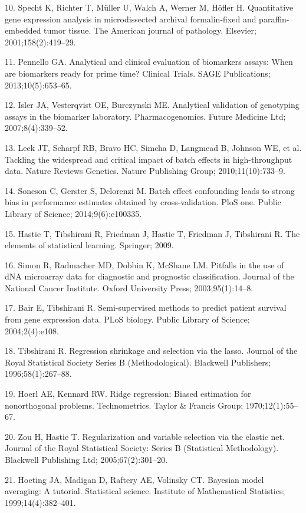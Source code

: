 \documentclass[11pt]{article}
\begin{document}
10. Specht K, Richter T, M{ü}ller U, Walch A, Werner M, H{ö}fler H.
Quantitative gene expression analysis in microdissected archival
formalin-fixed and paraffin-embedded tumor tissue. The American journal
of pathology. Elsevier; 2001;158(2):419--29.

11. Pennello GA. Analytical and clinical evaluation of biomarkers
assays: When are biomarkers ready for prime time? Clinical Trials. SAGE
Publications; 2013;10(5):653--65.

12. Isler JA, Vesterqvist OE, Burczynski ME. Analytical validation of
genotyping assays in the biomarker laboratory. Pharmacogenomics. Future
Medicine Ltd; 2007;8(4):339--52.

13. Leek JT, Scharpf RB, Bravo HC, Simcha D, Langmead B, Johnson WE, et
al. Tackling the widespread and critical impact of batch effects in
high-throughput data. Nature Reviews Genetics. Nature Publishing Group;
2010;11(10):733--9.

14. Soneson C, Gerster S, Delorenzi M. Batch effect confounding leads to
strong bias in performance estimates obtained by cross-validation. PloS
one. Public Library of Science; 2014;9(6):e100335.

15. Hastie T, Tibshirani R, Friedman J, Hastie T, Friedman J, Tibshirani
R. The elements of statistical learning. Springer; 2009.

16. Simon R, Radmacher MD, Dobbin K, McShane LM. Pitfalls in the use of
dNA microarray data for diagnostic and prognostic classification.
Journal of the National Cancer Institute. Oxford University Press;
2003;95(1):14--8.

17. Bair E, Tibshirani R. Semi-supervised methods to predict patient
survival from gene expression data. PLoS biology. Public Library of
Science; 2004;2(4):e108.

18. Tibshirani R. Regression shrinkage and selection via the lasso.
Journal of the Royal Statistical Society Series B (Methodological).
Blackwell Publishers; 1996;58(1):267--88.

19. Hoerl AE, Kennard RW. Ridge regression: Biased estimation for
nonorthogonal problems. Technometrics. Taylor \& Francis Group;
1970;12(1):55--67.

20. Zou H, Hastie T. Regularization and variable selection via the
elastic net. Journal of the Royal Statistical Society: Series B
(Statistical Methodology). Blackwell Publishing Ltd; 2005;67(2):301--20.

21. Hoeting JA, Madigan D, Raftery AE, Volinsky CT. Bayesian model
averaging: A tutorial. Statistical science. Institute of Mathematical
Statistics; 1999;14(4):382--401.
\end{document}
